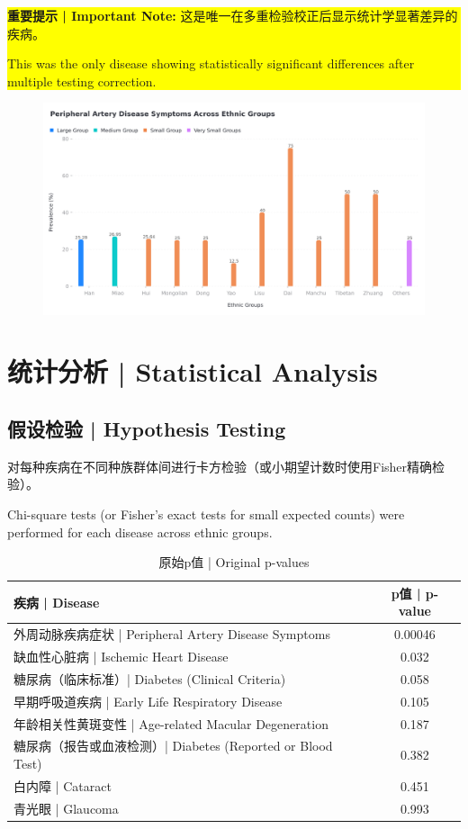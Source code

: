 \documentclass[12pt,a4paper]{article}
\begin{document}
\colorbox{yellow}{\parbox{\textwidth}{
\textbf{重要提示 | Important Note:} 这是唯一在多重检验校正后显示统计学显著差异的疾病。

This was the only disease showing statistically significant differences after multiple testing correction.
}}

\begin{figure}[H]
\hspace{-2cm}
\includegraphics[width=1.2\textwidth]{all/interactive_chart_peripheral_artery_disease.png}
\end{figure}

\section{统计分析 | Statistical Analysis}

\subsection{假设检验 | Hypothesis Testing}

对每种疾病在不同种族群体间进行卡方检验（或小期望计数时使用Fisher精确检验）。

Chi-square tests (or Fisher's exact tests for small expected counts) were performed for each disease across ethnic groups.

\begin{table}[H]
\centering
\caption{原始p值 | Original p-values}
\begin{tabular}{@{}lc@{}}
\toprule
\textbf{疾病 | Disease} & \textbf{p值 | p-value} \\
\midrule
外周动脉疾病症状 | Peripheral Artery Disease Symptoms & 0.00046 \\
缺血性心脏病 | Ischemic Heart Disease & 0.032 \\
糖尿病（临床标准）| Diabetes (Clinical Criteria) & 0.058 \\
早期呼吸道疾病 | Early Life Respiratory Disease & 0.105 \\
年龄相关性黄斑变性 | Age-related Macular Degeneration & 0.187 \\
糖尿病（报告或血液检测）| Diabetes (Reported or Blood Test) & 0.382 \\
白内障 | Cataract & 0.451 \\
青光眼 | Glaucoma & 0.993 \\
\bottomrule
\end{tabular}
\end{table}
\end{document}
